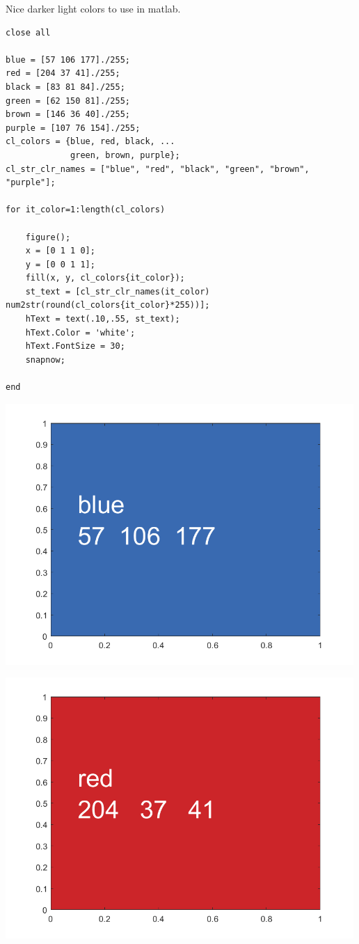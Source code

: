 \documentclass[
]{book}
\begin{document}
Nice darker light colors to use in matlab.

\begin{verbatim}
close all

blue = [57 106 177]./255;
red = [204 37 41]./255;
black = [83 81 84]./255;
green = [62 150 81]./255;
brown = [146 36 40]./255;
purple = [107 76 154]./255;
cl_colors = {blue, red, black, ...
             green, brown, purple};
cl_str_clr_names = ["blue", "red", "black", "green", "brown", "purple"];

for it_color=1:length(cl_colors)
    
    figure();
    x = [0 1 1 0];
    y = [0 0 1 1];
    fill(x, y, cl_colors{it_color});
    st_text = [cl_str_clr_names(it_color) num2str(round(cl_colors{it_color}*255))];
    hText = text(.10,.55, st_text);
    hText.Color = 'white';
    hText.FontSize = 30; 
    snapnow;
    
end
\end{verbatim}

\includegraphics[width=5.20833in,height=\textheight]{img/fs_color_images/figure_0.png}

\includegraphics[width=5.20833in,height=\textheight]{img/fs_color_images/figure_1.png}
\end{document}
